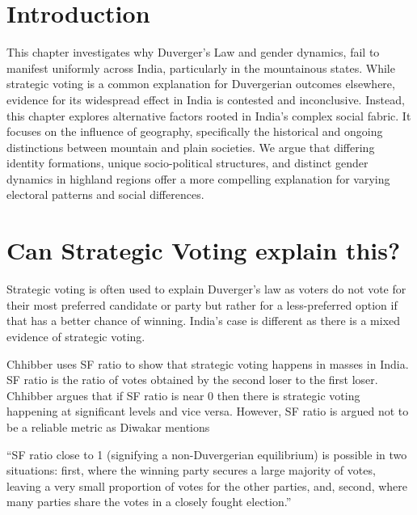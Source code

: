 \section{Introduction}
\begin{sloppypar}

This chapter investigates why Duverger’s Law and gender dynamics, fail to manifest uniformly across India, particularly in the mountainous states. While strategic voting is a common explanation for Duvergerian outcomes elsewhere, evidence for its widespread effect in India is contested and inconclusive. Instead, this chapter explores alternative factors rooted in India’s complex social fabric. It focuses on the  influence of geography, specifically the historical and ongoing distinctions between mountain and plain societies. We argue that differing identity formations, unique socio\hyp{}political structures, and distinct gender dynamics in highland regions offer a more compelling explanation for varying electoral patterns and social differences.

\end{sloppypar}
\section{Can Strategic Voting explain this?}

Strategic voting is often used to explain Duverger’s law as voters do not vote for their most preferred candidate or party but rather for a less\hyp{}preferred option if that has a better chance of winning. India’s case is different as there is a mixed evidence of strategic voting. 

\vspace{0.3cm}

Chhibber uses SF ratio to show that strategic voting happens in masses in India. SF ratio is the ratio of votes obtained by the second loser to the first loser. Chhibber argues that if SF ratio is near 0 then there is strategic voting happening at significant levels and vice versa. However, SF ratio is argued not to be a reliable metric as Diwakar mentions 

\vspace{0.3cm}

“SF ratio close to 1 (signifying a non\hyp{}Duvergerian equilibrium) is possible in two situations: first, where the winning party secures a large majority of votes, leaving a very small proportion of votes for the other parties, and, second, where many parties share the votes in a closely fought election.”

